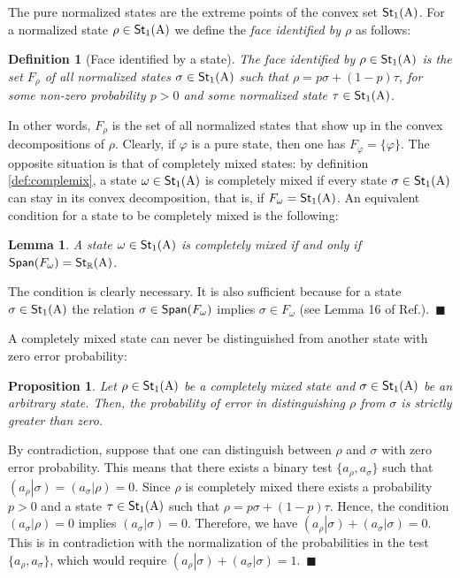 \documentclass[12pt,aps,pra,showpacs,groupedaddress]{revtex4-1}
\newtheorem{lemma}{Lemma} \newtheorem{proposition}{Proposition}
\newtheorem{definition}{Definition}
\def\Proof{\medskip\par\noindent{\bf Proof. }}
\def\qed{$\,\blacksquare$\par}
\def\Stset{{\mathsf{St}}}
\def\SC#1#2{\left(#1\right|\left.\!#2\right)}  \def\Tr{{\rm Tr}}
\def\Reals{{\mathbb R}}
\begin{document}
The pure normalized states are the extreme points of the convex set $\Stset_1 (\rA)$.  
For a normalized state $\rho \in\Stset_1 (\rA)$ we define the \emph{face identified by $\rho$} as follows:  
\begin{definition}[Face identified by a state]
The \emph{face identified by}  $\rho \in\Stset_1 (\rA)$  is the set $F_\rho$ of all normalized states $\sigma \in \Stset_1 (\rA)$ such that $\rho = p \sigma +
(1-p) \tau$, for some non-zero probability $p>0$ and some normalized state $\tau \in\Stset_1 (\rA)$.
\end{definition}
In other words, $F_\rho$ is the set of all normalized states that show up in the convex
decompositions of $\rho$.  Clearly, if $\varphi$ is a pure state, then one has $F_\varphi = \{\varphi\}$.
The opposite situation is that of completely mixed states: by definition \ref{def:complemix}, a state $\omega \in\Stset_1 (\rA)$
is completely mixed if every state $\sigma \in\Stset_1 (\rA)$ can stay in its convex
decomposition, that is, if $F_\omega = \Stset_1 (\rA)$.  An equivalent condition for a state to be
completely mixed is the following:
\begin{lemma}\label{lem:completely mixed spanning set}
A state $\omega  \in\Stset_1(\rA)$ is completely mixed if and only if  $\Span(F_\omega) =  \Stset_\Reals (\rA)$. 
\end{lemma}
\Proof The condition is clearly necessary.  It is also sufficient because for a state
$\sigma\in\Stset_1 (\rA)$ the relation $\sigma \in \mathsf{Span} (F_\omega)$ implies $\sigma \in F_\omega$
(see Lemma 16 of Ref.\cite{purification}). \qed


A completely mixed state can never be distinguished from another state with zero error probability: 
\begin{proposition}
  Let $\rho \in \Stset_1(\rA)$ be a completely mixed state and $\sigma \in\Stset_1 (\rA)$ be an
  arbitrary state.  Then, the probability of error in distinguishing $\rho$ from $\sigma$ is
  strictly greater than zero.
  \label{prop: no discrimination from completely mixed state}
\end{proposition}
\Proof By contradiction, suppose that one can distinguish between $\rho$ and $\sigma$ with zero
error probability.  This means that there exists a binary test $\{a_\rho, a_\sigma\}$ such that $
\SC {a_\rho } \sigma = \SC{a_\sigma} \rho = 0 $.  Since $\rho$ is completely mixed there exists a
probability $p>0$ and a state $\tau\in\Stset_1 (\rA)$ such that $\rho = p \sigma + (1-p) \tau$.
Hence, the condition $\SC {a_\sigma} \rho = 0$ implies $\SC {a_\sigma} \sigma= 0$.  Therefore, we
have $\SC {a_\rho} \sigma + \SC{a_\sigma} \sigma =0$.  This is in contradiction with the
normalization of the probabilities in the test $\{a_\rho, a_\sigma\}$, which would require $\SC
{a_\rho} \sigma + \SC {a_\sigma} \sigma = 1$.  \qed
\end{document}
